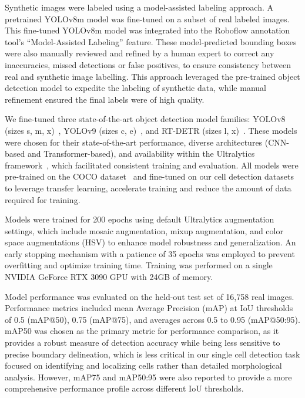 Synthetic images were labeled using a model-assisted labeling approach.
A pretrained YOLOv8m model was fine-tuned on a subset of real labeled images.
This fine-tuned YOLOv8m model was integrated into the Roboflow annotation tool's ``Model-Assisted Labeling'' feature.
These model-predicted bounding boxes were also manually reviewed and refined by a human expert to correct any inaccuracies, missed detections or false positives, to ensure consistency between real and synthetic image labelling.
This approach leveraged the pre-trained object detection model to expedite the labeling of synthetic data, while manual refinement ensured the final labels were of high quality.

We fine-tuned three state-of-the-art object detection model families: YOLOv8 (sizes s, m, x)~\cite{jocher_ultralytics_2023}, YOLOv9 (sizes c, e)~\cite{Wang2024YOLOv9LW}, and RT-DETR (sizes l, x)~\cite{Lv2023DETRsBY}.
These models were chosen for their state-of-the-art performance, diverse architectures (CNN-based and Transformer-based), and availability within the Ultralytics framework~\cite{jocher_ultralytics_2023}, which facilitated consistent training and evaluation.
All models were pre-trained on the COCO dataset~\cite{tsung-yi_lin_microsoft_2014} and fine-tuned on our cell detection datasets to leverage transfer learning, accelerate training and reduce the amount of data required for training.

Models were trained for 200 epochs using default Ultralytics augmentation settings, which include mosaic augmentation, mixup augmentation, and color space augmentations (HSV) to enhance model robustness and generalization.
An early stopping mechanism with a patience of 35 epochs was employed to prevent overfitting and optimize training time.
Training was performed on a single NVIDIA GeForce RTX 3090 GPU with 24GB of memory.

Model performance was evaluated on the held-out test set of 16,758 real images.
Performance metrics included mean Average Precision (mAP) at IoU thresholds of 0.5 (mAP@50), 0.75 (mAP@75), and averages across 0.5 to 0.95 (mAP@50:95).
mAP\@50 was chosen as the primary metric for performance comparison, as it provides a robust measure of detection accuracy while being less sensitive to precise boundary delineation, which is less critical in our single cell detection task focused on identifying and localizing cells rather than detailed morphological analysis.
However, mAP\@75 and mAP\@50:95 were also reported to provide a more comprehensive performance profile across different IoU thresholds.

